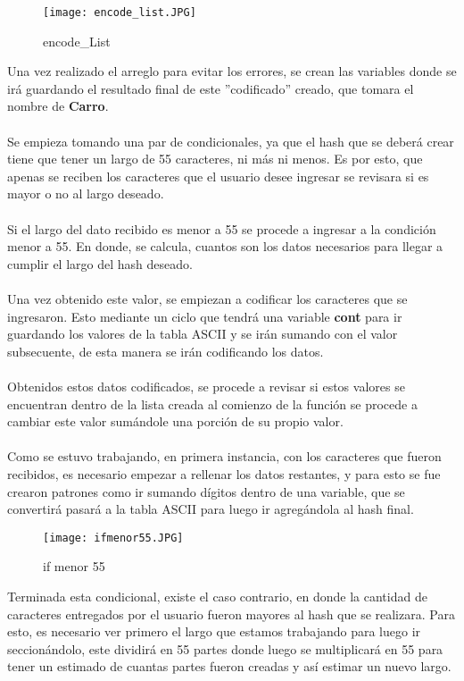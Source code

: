 \documentclass{article}
\begin{document}
\begin{figure}[h!]
    \centering
    \texttt{[image: encode\_list.JPG]}
    \caption{encode\_List}
    \label{fig:my_label}
\end{figure}
Una vez realizado el arreglo para evitar los errores, se crean las variables donde se irá guardando el resultado final de este ''codificado'' creado, que tomara el nombre de \textbf{Carro}.
\\\\
Se empieza tomando una par de condicionales, ya que el hash que se deberá crear tiene que tener un largo de 55 caracteres, ni más ni menos. Es por esto, que apenas se reciben los caracteres que el usuario desee ingresar se revisara si es mayor o no al largo deseado. 
\\\\
Si el largo del dato recibido es menor a 55 se procede a ingresar a la condición menor a 55. En donde, se calcula, cuantos son los datos necesarios para llegar a cumplir el largo del hash deseado. 
\\\\
Una vez obtenido este valor, se empiezan a codificar los caracteres que se ingresaron. Esto mediante un ciclo que tendrá una variable \textbf{cont} para ir guardando los valores de la tabla ASCII y se irán sumando con el valor subsecuente, de esta manera se irán codificando los datos.
\\\\
Obtenidos estos datos codificados, se procede a revisar si estos valores se encuentran dentro de la lista creada al comienzo de la función se procede a cambiar este valor sumándole una porción de su propio valor.
\\\\
Como se estuvo trabajando, en primera instancia, con los caracteres que fueron recibidos, es necesario empezar a rellenar los datos restantes, y para esto se fue crearon patrones como ir sumando dígitos dentro de una variable, que se convertirá pasará a la tabla ASCII para luego ir agregándola al hash final. 
\begin{figure}[h]
    \centering
    \texttt{[image: ifmenor55.JPG]}
    \caption{if menor 55}
    \label{fig:my_label}
\end{figure}
\newpage
Terminada esta condicional, existe el caso contrario, en donde la cantidad de caracteres entregados por el usuario fueron mayores al hash que se realizara. Para esto, es necesario ver primero el largo que estamos trabajando para luego ir seccionándolo, este dividirá en 55 partes donde luego se multiplicará en 55 para tener un estimado de cuantas partes fueron creadas y así estimar un nuevo largo.
\end{document}
